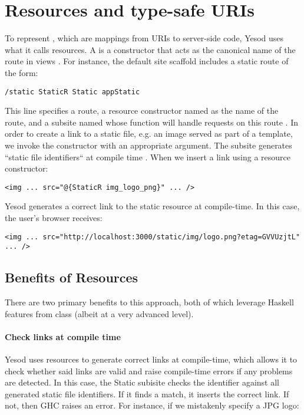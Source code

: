\section{Resources and type-safe URIs}

To represent , which are mappings from URIs to server-side code, Yesod uses what it calls resources. A  is a  constructor that acts as the canonical name of the route in views \cite{ybk}. For instance, the default site scaffold includes a static route of the form:

\begin{Verbatim}
/static StaticR Static appStatic
\end{Verbatim}

This line specifies a  route, a resource constructor named  as the name of the route, and a subsite named  whose function  will handle requests on this route \cite{ybkRouting}. In order to create a link to a static file, e.g. an image served as part of a template, we invoke the  constructor with an appropriate argument. The  subsite generates ``static file identifiers`` at compile time \cite{ybkScaffolding}. When we insert a link using a resource constructor:

\begin{Verbatim}
<img ... src="@{StaticR img_logo_png}" ... />
\end{Verbatim}

Yesod generates a correct link to the static resource at compile-time. In this case, the user's browser receives:

\begin{Verbatim}
<img ... src="http://localhost:3000/static/img/logo.png?etag=GVVUzjtL" ... />
\end{Verbatim}

\subsection{Benefits of Resources}

There are two primary benefits to this approach, both of which leverage Haskell features from class (albeit at a very advanced level).

\paragraph{Check links at compile time} Yesod uses resources to generate correct links at compile-time, which allows it to check whether said links are valid and raise compile-time errors if any problems are detected. In this case, the Static subisite checks the identifier  against all generated static file identifiers. If it finds a match, it inserts the correct link. If not, then GHC raises an error. For instance, if we mistakenly specify a JPG logo:

